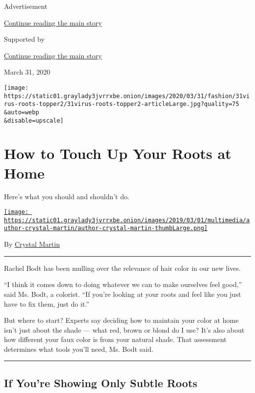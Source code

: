 Advertisement

\protect\hyperlink{after-top}{Continue reading the main story}

Supported by

\protect\hyperlink{after-sponsor}{Continue reading the main story}

March 31, 2020

\texttt{[image: https://static01.graylady3jvrrxbe.onion/images/2020/03/31/fashion/31virus-roots-topper2/31virus-roots-topper2-articleLarge.jpg?quality=75\\\&auto=webp\\\&disable=upscale]}

\hypertarget{how-to-touch-up-your-roots-at-home}{%
\section{How to Touch Up Your Roots at
Home}\label{how-to-touch-up-your-roots-at-home}}

Here's what you should and shouldn't do.

\href{https://www.nytimes3xbfgragh.onion/by/crystal-martin}{\texttt{[image: https://static01.graylady3jvrrxbe.onion/images/2019/03/01/multimedia/author-crystal-martin/author-crystal-martin-thumbLarge.png]}}

By \href{https://www.nytimes3xbfgragh.onion/by/crystal-martin}{Crystal
Martin}

\begin{center}\rule{0.5\linewidth}{\linethickness}\end{center}

Rachel Bodt has been mulling over the relevance of hair color in our new
lives.

``I think it comes down to doing whatever we can to make ourselves feel
good,'' said Ms. Bodt, a colorist. ``If you're looking at your roots and
feel like you just have to fix them, just do it.''

But where to start? Experts say deciding how to maintain your color at
home isn't just about the shade --- what red, brown or blond do I use?
It's also about how different your faux color is from your natural
shade. That assessment determines what tools you'll need, Ms. Bodt said.

\begin{center}\rule{0.5\linewidth}{\linethickness}\end{center}

\hypertarget{if-youre-showing-only-subtle-roots}{%
\subsection{If You're Showing Only Subtle
Roots}\label{if-youre-showing-only-subtle-roots}}

